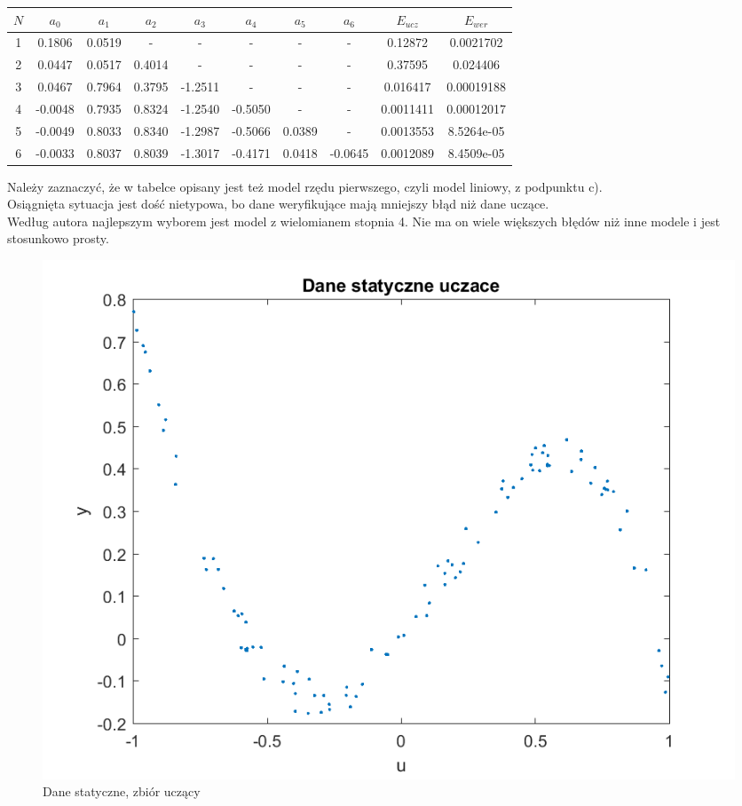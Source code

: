 \documentclass{article}
\begin{document}
\begin{tabular}{|c|c|c|c|c|c|c|c|c|c|}
\hline 
$N$ & $a_0$ & $a_1$ & $a_2$ & $a_3$ & $a_4$ & $a_5$ & $a_6$ & $E_{ucz}$ & $E_{wer}$ \\ 
\hline 
1 & 0.1806 & 0.0519 & - & - & - & - & - & 0.12872 & 0.0021702 \\ 
\hline 
2 & 0.0447 & 0.0517 & 0.4014 & - & - & - & - & 0.37595 & 0.024406 \\ 
\hline 
3 & 0.0467 &  0.7964&0.3795  &-1.2511  & - & - &-  &0.016417  &0.00019188  \\ 
\hline 
4 & -0.0048 & 0.7935 & 0.8324 & -1.2540  & -0.5050 & - & - & 0.0011411 & 0.00012017 \\ 
\hline 
5 &-0.0049  & 0.8033 & 0.8340 &   -1.2987&  -0.5066& 0.0389 & - & 0.0013553 & 8.5264e-05 \\ 
\hline 
6 & -0.0033 &  0.8037&  0.8039& -1.3017 &-0.4171  &0.0418  & -0.0645 & 0.0012089 & 8.4509e-05 \\ 
\hline 

\end{tabular} 
Należy zaznaczyć, że w tabelce opisany jest też model rzędu pierwszego, czyli model liniowy, z podpunktu c).\\
Osiągnięta sytuacja jest dość nietypowa, bo dane weryfikujące mają mniejszy błąd niż dane uczące.\\
Według autora najlepszym wyborem jest model z wielomianem stopnia 4. Nie ma on wiele większych błędów niż inne modele i jest stosunkowo prosty.
\begin{figure}
\centering
\includegraphics[width=0.95\linewidth]{dane_statyczne_uczace}
\caption{Dane statyczne, zbiór uczący}
\label{fig:danestatyczneuczace}
\end{figure}
\end{document}
